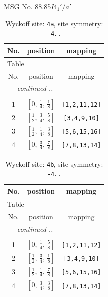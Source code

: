 \documentclass[fleqn,8pt]{jsarticle}
\begin{document}
\setcounter{MaxMatrixCols}{32}

\renewcommand{\tablename}{Table~}
\renewcommand{\figurename}{Figure~}
\begin{center}
\LARGE
MSG No. 88.85\quad$I4_{1}'/a'$
\end{center}
\renewcommand{\arraystretch}{1.2}
\begin{longtable}{ccc}
\caption{Wyckoff site: {\tt 4a}, site symmetry: {\tt -4..}}
 \\
 \hline \hline
No. & position & mapping \\ \hline \endfirsthead

\multicolumn{2}{l}{\tablename\ \thetable{}} \\
 \hline \hline
No. & position & mapping \\ \hline \endhead

 \hline \hline
\multicolumn{2}{r}{\footnotesize\it continued ...} \\ \endfoot

 \hline \hline
\multicolumn{2}{r}{} \\ \endlastfoot

1 & $\left[ 0,\, \frac{1}{4},\, \frac{1}{8} \right]$ & {\tt [1,2,11,12]} \\ \hline
2 & $\left[ \frac{1}{2},\, \frac{3}{4},\, \frac{5}{8} \right]$ & {\tt [3,4,9,10]} \\ \hline
3 & $\left[ \frac{1}{2},\, \frac{1}{4},\, \frac{3}{8} \right]$ & {\tt [5,6,15,16]} \\ \hline
4 & $\left[ 0,\, \frac{3}{4},\, \frac{7}{8} \right]$ & {\tt [7,8,13,14]} \\
\end{longtable}
\renewcommand{\arraystretch}{1.2}
\begin{longtable}{ccc}
\caption{Wyckoff site: {\tt 4b}, site symmetry: {\tt -4..}}
 \\
 \hline \hline
No. & position & mapping \\ \hline \endfirsthead

\multicolumn{2}{l}{\tablename\ \thetable{}} \\
 \hline \hline
No. & position & mapping \\ \hline \endhead

 \hline \hline
\multicolumn{2}{r}{\footnotesize\it continued ...} \\ \endfoot

 \hline \hline
\multicolumn{2}{r}{} \\ \endlastfoot

1 & $\left[ 0,\, \frac{1}{4},\, \frac{5}{8} \right]$ & {\tt [1,2,11,12]} \\ \hline
2 & $\left[ \frac{1}{2},\, \frac{3}{4},\, \frac{1}{8} \right]$ & {\tt [3,4,9,10]} \\ \hline
3 & $\left[ \frac{1}{2},\, \frac{1}{4},\, \frac{7}{8} \right]$ & {\tt [5,6,15,16]} \\ \hline
4 & $\left[ 0,\, \frac{3}{4},\, \frac{3}{8} \right]$ & {\tt [7,8,13,14]} \\
\end{longtable}
\end{document}
